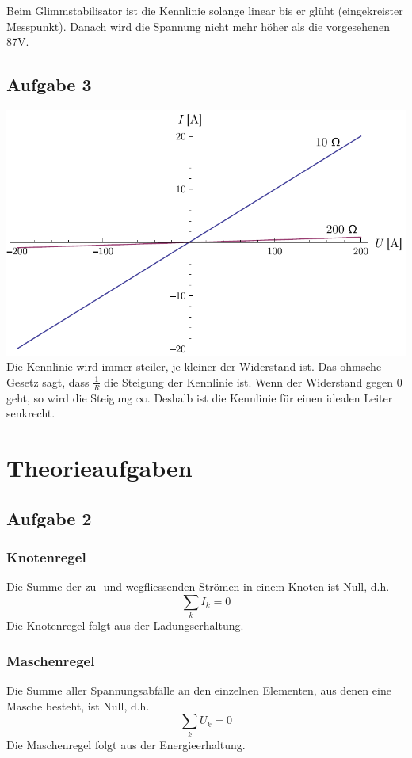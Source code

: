 \documentclass[12pt,a4paper]{article}
\begin{document}
Beim Glimmstabilisator ist die Kennlinie solange linear bis er gl\"uht (eingekreister Messpunkt). Danach wird die Spannung nicht mehr h\"oher als die vorgesehenen 87V.

\subsection*{Aufgabe 3}
\includegraphics[width=15cm]{ohm.pdf}
\noindent
Die Kennlinie wird immer steiler, je kleiner der Widerstand ist. Das ohmsche Gesetz sagt, dass $\frac{1}{R}$ die Steigung der Kennlinie ist. Wenn der Widerstand gegen $0$ geht, so wird die Steigung $\infty$. Deshalb ist die Kennlinie f\"ur einen idealen Leiter senkrecht.

\newpage
\section*{Theorieaufgaben}

\subsection*{Aufgabe 2}
\subsubsection*{Knotenregel}
Die Summe der zu- und wegfliessenden Str\"omen in einem Knoten ist Null, d.h.
\[ \sum_kI_k = 0 \]
Die Knotenregel folgt aus der Ladungserhaltung.

\subsubsection*{Maschenregel}
Die Summe aller Spannungsabf\"alle an den einzelnen Elementen, aus denen eine Masche besteht, ist Null, d.h.
\[ \sum_kU_k = 0\]
Die Maschenregel folgt aus der Energieerhaltung.
\end{document}
